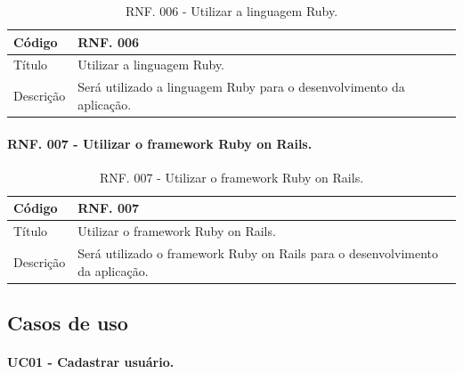 \documentclass[11pt]{article}
\begin{document}
      \begin{table}[h]
        \begin{center}
          \begin{tabular}{ | p{5cm} | p{10cm} | }
            \hline
            Código\cellcolor{gray} & RNF. 006\cellcolor{gray} \\
            \hline
            Título & Utilizar a linguagem Ruby. \\
            \hline
            Descrição & Será utilizado a linguagem Ruby para o desenvolvimento da aplicação. \\
            \hline
          \end{tabular}
          \caption{RNF. 006 - Utilizar a linguagem Ruby.}
        \end{center}
      \end{table}

      \paragraph{RNF. 007 - Utilizar o framework Ruby on Rails.} \hspace{10pt}

      \begin{table}[h]
        \begin{center}
          \begin{tabular}{ | p{5cm} | p{10cm} | }
            \hline
            Código\cellcolor{gray} & RNF. 007\cellcolor{gray} \\
            \hline
            Título & Utilizar o framework Ruby on Rails. \\
            \hline
            Descrição & Será utilizado o framework Ruby on Rails para o desenvolvimento da aplicação. \\
            \hline
          \end{tabular}
          \caption{RNF. 007 - Utilizar o framework Ruby on Rails.}
        \end{center}
      \end{table}

  \newpage

    \subsection{Casos de uso}

      \paragraph{UC01 - Cadastrar usuário.} \hspace{10pt}
\end{document}
